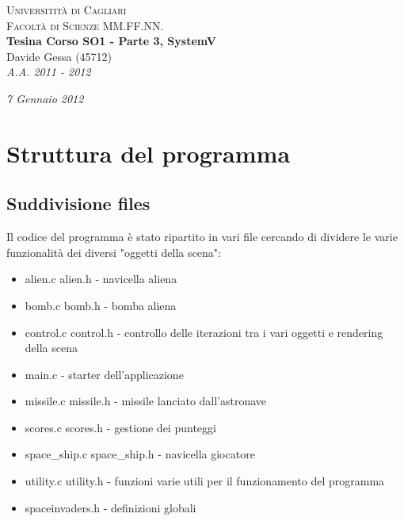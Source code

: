 \documentclass[a4paper,11pt]{report}
\begin{document}
\thispagestyle{empty}
\pagestyle{empty}

\begin{center}
\textsc{Universitità di Cagliari}\\[0.4cm]
\textsc{Facoltà di Scienze MM.FF.NN.}\\[5.5cm]

\textbf{{\large Tesina Corso SO1 - Parte 3, SystemV}}\\[0.6cm]
Davide Gessa (45712)\\[0.4cm]
\textit{A.A. 2011 - 2012\\[0.4cm]}

\vfill
\textit{7 Gennaio 2012\\[1.5cm]}


\end{center}

\newpage
\tableofcontents


\chapter{Struttura del programma}

\section{Suddivisione files}
Il codice del programma è stato ripartito in vari file cercando di dividere le varie 
funzionalità dei diversi "oggetti della scena":

\begin{itemize}
  \item alien.c alien.h - navicella aliena
  \item bomb.c bomb.h - bomba aliena
  \item control.c control.h - controllo delle iterazioni tra i vari oggetti e rendering della scena
  \item main.c - starter dell'applicazione
  \item missile.c missile.h - missile lanciato dall'astronave
  \item scores.c scores.h - gestione dei punteggi
  \item space_ship.c space_ship.h - navicella giocatore
  \item utility.c utility.h - funzioni varie utili per il funzionamento del programma
  \item spaceinvaders.h - definizioni globali
\end{itemize}
\end{document}
